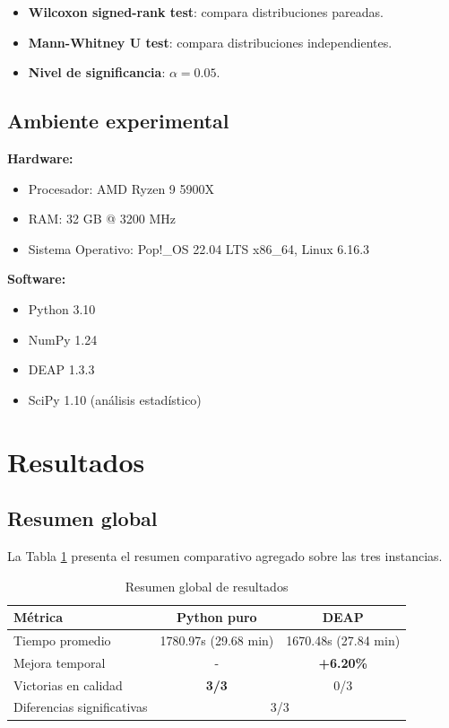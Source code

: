 \documentclass[12pt,a4paper]{article}
\begin{document}
\begin{itemize}
    \item \textbf{Wilcoxon signed-rank test}: compara distribuciones pareadas.
    \item \textbf{Mann-Whitney U test}: compara distribuciones independientes.
    \item \textbf{Nivel de significancia}: $\alpha = 0.05$.
\end{itemize}

\subsection{Ambiente experimental}

\textbf{Hardware:}
\begin{itemize}
    \item Procesador: AMD Ryzen 9 5900X
    \item RAM: 32 GB @ 3200 MHz
    \item Sistema Operativo: Pop!\_OS 22.04 LTS x86\_64, Linux 6.16.3
\end{itemize}

\textbf{Software:}
\begin{itemize}
    \item Python 3.10
    \item NumPy 1.24
    \item DEAP 1.3.3
    \item SciPy 1.10 (análisis estadístico)
\end{itemize}

\section{Resultados}

\subsection{Resumen global}

La Tabla \ref{tab:resumen_global} presenta el resumen comparativo agregado sobre las tres instancias.

\begin{table}[H]
\centering
\caption{Resumen global de resultados}
\label{tab:resumen_global}
\begin{tabular}{@{}lcc@{}}
\toprule
\textbf{Métrica} & \textbf{Python puro} & \textbf{DEAP} \\ \midrule
Tiempo promedio & 1780.97s (29.68 min) & 1670.48s (27.84 min) \\
Mejora temporal & - & \textbf{+6.20\%} \\
Victorias en calidad & \textbf{3/3} & 0/3 \\
Diferencias significativas & \multicolumn{2}{c}{3/3} \\
\bottomrule
\end{tabular}
\end{table}
\end{document}
